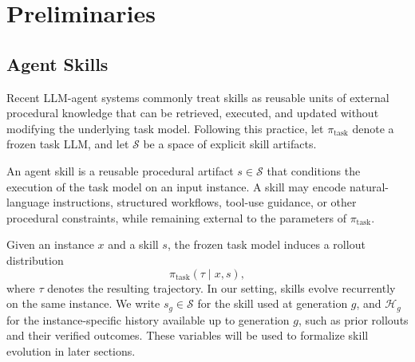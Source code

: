 \section{Preliminaries}\label{sec:preliminaries}

\subsection{Agent Skills} \label{sec:prelim-skills}
Recent LLM-agent systems commonly treat skills as reusable units of external procedural knowledge that can be retrieved, executed, and updated without modifying the underlying task model. 
Following this practice, let $\pi_{\mathrm{task}}$ denote a frozen task LLM, and let $\mathcal{S}$ be a space of explicit skill artifacts.

\begin{definition}
An agent skill is a reusable procedural artifact $s \in \mathcal{S}$ that conditions the execution of the task model on an input instance. 
A skill may encode natural-language instructions, structured workflows, tool-use guidance, or other procedural constraints, while remaining external to the parameters of $\pi_{\mathrm{task}}$.
\end{definition}

Given an instance $x$ and a skill $s$, the frozen task model induces a rollout distribution
\begin{equation} \label{eq:rollout_dist}
\pi_{\mathrm{task}}(\tau \mid x, s),
\end{equation}
where $\tau$ denotes the resulting trajectory. 
In our setting, skills evolve recurrently on the same instance. 
We write $s_g \in \mathcal{S}$ for the skill used at generation $g$, and $\mathcal{H}_g$ for the instance-specific history available up to generation $g$, such as prior rollouts and their verified outcomes. 
These variables will be used to formalize skill evolution in later sections.


